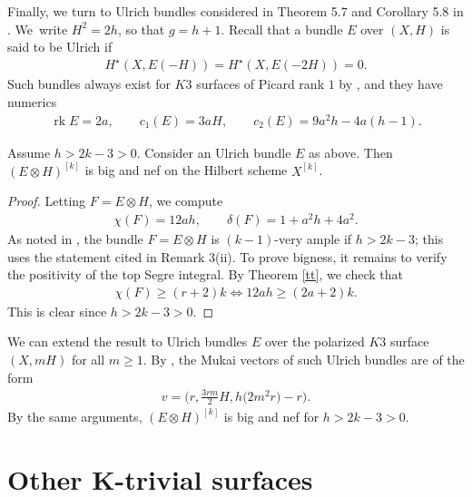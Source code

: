 \documentclass[pdftex]{sigma}
\numberwithin{equation}{section}
\newcommand{\rk}{\operatorname{rk}}
\begin{document}
Finally, we turn to Ulrich bundles considered in Theorem 5.7 and Corollary 5.8 in \cite{BBF}. We~write $H^2=2h$, so that $g=h+1$. Recall that a bundle $E$ over $(X, H)$ is said to be Ulrich if
\begin{gather*}
H^{\star}(X, E(-H))=H^\star(X, E(-2H))=0.
\end{gather*}
Such bundles always exist for $K3$ surfaces of Picard rank $1$ by \cite[Theorem 1.5]{AFO}, and they have numerics
\begin{gather*}
\rk E=2a, \qquad c_1(E)=3aH,\qquad c_2(E)=9a^2h-4a(h-1).
\end{gather*}

\begin{Example}%
Assume $h>2k-3>0$. Consider an Ulrich bundle $E$ as above. Then $(E\otimes H)^{[k]}$ is big and nef on the Hilbert scheme $X^{[k]}$.
\end{Example}

\begin{proof} Letting $F=E\otimes H$, we compute
\begin{gather*}
\chi(F)=12ah, \qquad \delta(F)=1+a^2h+4a^2.
\end{gather*}
As noted in \cite[Theorem 5.6]{BBF}, the bundle $F=E\otimes H$ is $(k-1)$-very ample if $h>2k-3$; this uses the statement cited in Remark 3(ii). To prove bigness, it remains to verify the positivity of the top Segre integral. By Theorem \ref{tt}, we check that
\begin{gather*}
\chi(F)\geq (r+2)k\iff 12ah\geq (2a+2)k.
\end{gather*}
This is clear since $h> 2k-3>0$.
\end{proof}


\begin{Example}
We can extend the result to Ulrich bundles $E$ over the polarized $K3$ surface $(X, mH)$ for all $m\geq 1$. By \cite[Proposition 4.4]{CNY}, the Mukai vectors of such Ulrich bundles are of the form
\begin{gather*}
v=\biggl(r, \frac{3rm}{2}H, h\big(2m^2r\big)-r\biggr).
\end{gather*}
By the same arguments, $(E\otimes H)^{[k]}$ is big and nef for $h>2k-3>0$.
\end{Example}

\section[Other K-trivial surfaces]
{Other $\boldsymbol K$-trivial surfaces} \label{secktriv}
\end{document}

